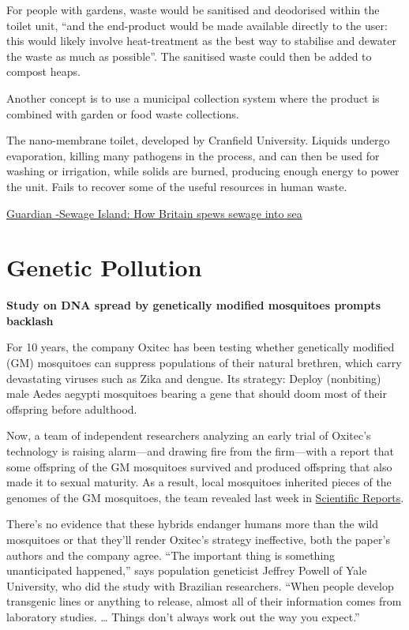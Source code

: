 \documentclass[
]{book}
\begin{document}
For people with gardens, waste would be sanitised and deodorised within the toilet unit, ``and the end-product would be made available directly to the user: this would likely involve heat-treatment as the best way to stabilise and dewater the waste as much as possible''. The sanitised waste could then be added to compost heaps.

Another concept is to use a municipal collection system where the product is combined with garden or food waste collections.

The nano-membrane toilet, developed by Cranfield University. Liquids undergo evaporation, killing many pathogens in the process, and can then be used for washing or irrigation, while solids are burned, producing enough energy to power the unit.
Fails to recover some of the useful resources in human waste.

\href{https://www.theguardian.com/environment/2021/apr/19/sewage-island-how-britain-spews-untreated-waste-rivers-sea}{Guardian -Sewage Island: How Britain spews sewage into sea}

\hypertarget{genetic-pollution}{%
\section{Genetic Pollution}\label{genetic-pollution}}

\textbf{Study on DNA spread by genetically modified mosquitoes prompts backlash}

For 10 years, the company Oxitec has been testing whether genetically modified (GM) mosquitoes can suppress populations of their natural brethren, which carry devastating viruses such as Zika and dengue. Its strategy: Deploy (nonbiting) male Aedes aegypti mosquitoes bearing a gene that should doom most of their offspring before adulthood.

Now, a team of independent researchers analyzing an early trial of Oxitec's technology is raising alarm---and drawing fire from the firm---with a report that some offspring of the GM mosquitoes survived and produced offspring that also made it to sexual maturity. As a result, local mosquitoes inherited pieces of the genomes of the GM mosquitoes, the team revealed last week in \href{https://www.nature.com/articles/s41598-019-49660-6}{Scientific Reports}.

There's no evidence that these hybrids endanger humans more than the wild mosquitoes or that they'll render Oxitec's strategy ineffective, both the paper's authors and the company agree. ``The important thing is something unanticipated happened,'' says population geneticist Jeffrey Powell of Yale University, who did the study with Brazilian researchers. ``When people develop transgenic lines or anything to release, almost all of their information comes from laboratory studies. \ldots{} Things don't always work out the way you expect.''
\end{document}
